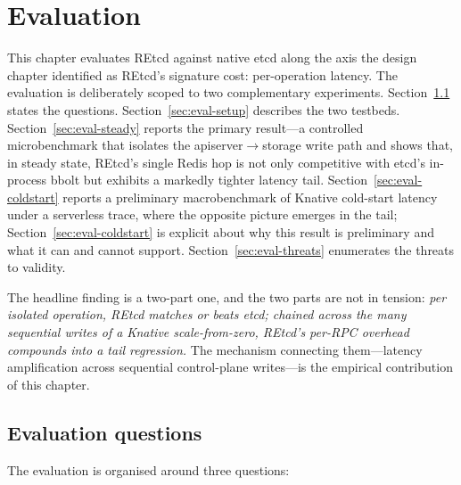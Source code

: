 %
%

\chapter{Evaluation}
\label{ch:evaluation}

This chapter evaluates REtcd against native etcd along the axis the design chapter identified as REtcd's signature cost: per-operation latency. The evaluation is deliberately scoped to two complementary experiments. Section~\ref{sec:eval-questions} states the questions. Section~\ref{sec:eval-setup} describes the two testbeds. Section~\ref{sec:eval-steady} reports the primary result---a controlled microbenchmark that isolates the apiserver$\rightarrow$storage write path and shows that, in steady state, REtcd's single Redis hop is not only competitive with etcd's in-process bbolt but exhibits a markedly tighter latency tail. Section~\ref{sec:eval-coldstart} reports a preliminary macrobenchmark of Knative cold-start latency under a serverless trace, where the opposite picture emerges in the tail; Section~\ref{sec:eval-coldstart} is explicit about why this result is preliminary and what it can and cannot support. Section~\ref{sec:eval-threats} enumerates the threats to validity.

The headline finding is a two-part one, and the two parts are not in tension: \emph{per isolated operation, REtcd matches or beats etcd; chained across the many sequential writes of a Knative scale-from-zero, REtcd's per-RPC overhead compounds into a tail regression.} The mechanism connecting them---latency amplification across sequential control-plane writes---is the empirical contribution of this chapter.

\section{Evaluation questions}
\label{sec:eval-questions}

The evaluation is organised around three questions:

